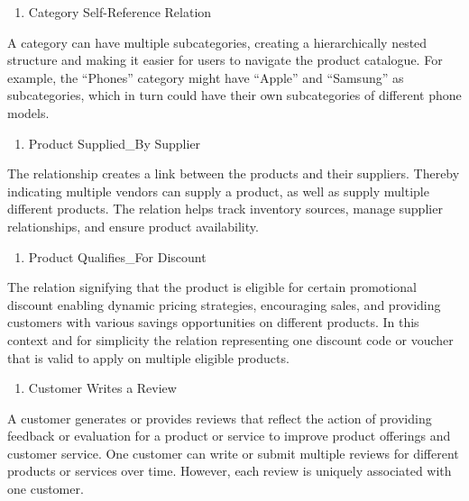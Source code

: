 \documentclass[
]{article}
\providecommand{\tightlist}{%
  \setlength{\itemsep}{0pt}\setlength{\parskip}{0pt}}
\begin{document}
\begin{enumerate}
\def\labelenumi{\arabic{enumi}.}
\setcounter{enumi}{3}
\tightlist
\item
  Category Self-Reference Relation
\end{enumerate}

A category can have multiple subcategories, creating a hierarchically
nested structure and making it easier for users to navigate the product
catalogue. For example, the ``Phones'' category might have ``Apple'' and
``Samsung'' as subcategories, which in turn could have their own
subcategories of different phone models.

\begin{enumerate}
\def\labelenumi{\arabic{enumi}.}
\setcounter{enumi}{4}
\tightlist
\item
  Product Supplied\_By Supplier
\end{enumerate}

The relationship creates a link between the products and their
suppliers. Thereby indicating multiple vendors can supply a product, as
well as supply multiple different products. The relation helps track
inventory sources, manage supplier relationships, and ensure product
availability.

\begin{enumerate}
\def\labelenumi{\arabic{enumi}.}
\setcounter{enumi}{5}
\tightlist
\item
  Product Qualifies\_For Discount
\end{enumerate}

The relation signifying that the product is eligible for certain
promotional discount enabling dynamic pricing strategies, encouraging
sales, and providing customers with various savings opportunities on
different products. In this context and for simplicity the relation
representing one discount code or voucher that is valid to apply on
multiple eligible products.

\begin{enumerate}
\def\labelenumi{\arabic{enumi}.}
\setcounter{enumi}{6}
\tightlist
\item
  Customer Writes a Review
\end{enumerate}

A customer generates or provides reviews that reflect the action of
providing feedback or evaluation for a product or service to improve
product offerings and customer service. One customer can write or submit
multiple reviews for different products or services over time. However,
each review is uniquely associated with one customer.
\end{document}
